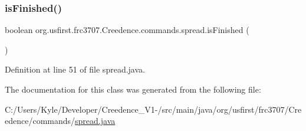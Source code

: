 \subsubsection{\texorpdfstring{isFinished()}{isFinished()}}
{\footnotesize\ttfamily boolean org.\+usfirst.\+frc3707.\+Creedence.\+commands.\+spread.\+is\+Finished (\begin{DoxyParamCaption}{ }\end{DoxyParamCaption})\hspace{0.3cm}{\ttfamily [protected]}}



Definition at line 51 of file spread.\+java.



The documentation for this class was generated from the following file\+:\begin{DoxyCompactItemize}
\item 
C\+:/\+Users/\+Kyle/\+Developer/\+Creedence\+\_\+\+V1-\//src/main/java/org/usfirst/frc3707/\+Creedence/commands/\mbox{\hyperlink{spread_8java}{spread.\+java}}\end{DoxyCompactItemize}

